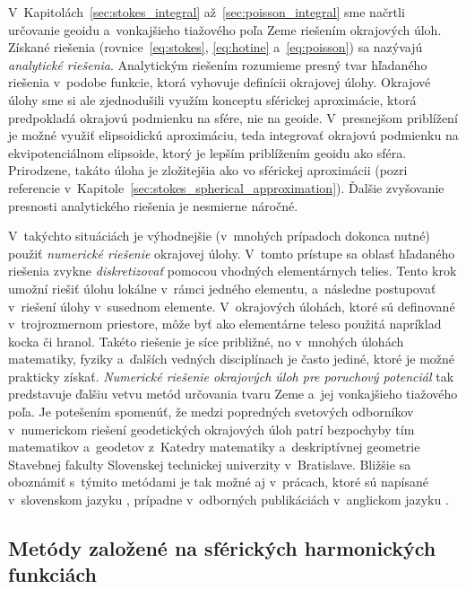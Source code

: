 \documentclass[a4paper, 12pt]{book}
\begin{document}
V~Kapitolách~\ref{sec:stokes_integral} až~\ref{sec:poisson_integral} sme 
načrtli určovanie geoidu a~vonkajšieho tiažového poľa Zeme riešením okrajových 
úloh.  Získané riešenia (rovnice~\ref{eq:stokes}, \ref{eq:hotine} 
a~\ref{eq:poisson}) sa nazývajú \emph{analytické riešenia}.  Analytickým 
riešením rozumieme presný tvar hľadaného riešenia v~podobe funkcie, ktorá 
vyhovuje definícii okrajovej úlohy.  Okrajové úlohy sme si ale zjednodušili 
využím konceptu sférickej aproximácie, ktorá predpokladá okrajovú podmienku na 
sfére, nie na geoide.  V~presnejšom priblížení je možné využiť elipsoidickú 
aproximáciu, teda integrovať okrajovú podmienku na ekvipotenciálnom elipsoide, 
ktorý je lepším priblížením geoidu ako sféra.  Prirodzene, takáto úloha je 
zložitejšia ako vo sférickej aproximácii (pozri referencie 
v~Kapitole~\ref{sec:stokes_spherical_approximation}).  Ďalšie zvyšovanie 
presnosti analytického riešenia je nesmierne náročné.

V~takýchto situáciách je výhodnejšie (v~mnohých prípadoch dokonca nutné) použiť 
\emph{numerické riešenie} okrajovej úlohy.  V~tomto prístupe sa oblasť 
hľadaného riešenia zvykne \emph{diskretizovať} pomocou vhodných elementárnych 
telies.  Tento krok umožní riešiť úlohu lokálne v~rámci jedného elementu, 
a~následne postupovať v~riešení úlohy v~susednom elemente.  V~okrajových 
úlohách, ktoré sú definované v~trojrozmernom priestore, môže byť ako 
elementárne teleso použitá napríklad kocka či hranol.  Takéto riešenie je síce 
približné, no v~mnohých úlohách matematiky, fyziky a~ďalších vedných 
disciplínach je často jediné, ktoré je možné prakticky získať.  \emph{Numerické 
riešenie okrajových úloh pre poruchový potenciál} tak predstavuje ďalšiu vetvu 
metód určovania tvaru Zeme a~jej vonkajšieho tiažového poľa.  Je potešením 
spomenúť, že medzi popredných svetových odborníkov v~numerickom riešení 
geodetických okrajových úloh patrí bezpochyby tím matematikov a~geodetov 
z~Katedry matematiky a~deskriptívnej geometrie Stavebnej fakulty Slovenskej 
technickej univerzity v~Bratislave.  Bližšie sa oboznámiť s~týmito metódami je 
tak možné aj v~prácach, ktoré sú napísané v~slovenskom jazyku 
\parencite[napríklad][]{Janak2006,Macak2021}, prípadne v~odborných publikáciách 
v~anglickom jazyku 
\parencite[napríklad][]{Cunderlik2008,Faskova2010,Macak2014}.


\subsection{Metódy založené na sférických harmonických funkciách}
\end{document}
